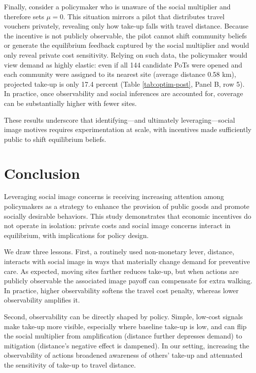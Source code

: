\documentclass[12pt,a4paper]{article}
\begin{document}
Finally, consider a policymaker who is unaware of the social multiplier and therefore sets $\mu=0$. This situation mirrors a pilot that distributes travel vouchers privately, revealing only how take‑up falls with travel distance. Because the incentive is not publicly observable, the pilot cannot shift community beliefs or generate the equilibrium feedback captured by the social multiplier and would only reveal private cost sensitivity. Relying on such data, the policymaker would view demand as highly elastic: even if all 144 candidate PoTs were opened and each community were assigned to its nearest site (average distance 0.58 km), projected take‑up is only 17.4 percent (Table \ref{tab:optim-post}, Panel B, row 5). In practice, once observability and social inferences are accounted for, coverage can be substantially higher with fewer sites.  

These results underscore that identifying—and ultimately leveraging—social image motives requires experimentation at scale, with incentives made sufficiently public to shift equilibrium beliefs.


\FloatBarrier
\section{Conclusion} \label{conclusion}

Leveraging social image concerns is receiving increasing attention among policymakers as a strategy to enhance the provision of public goods and promote socially desirable behaviors. This study demonstrates that economic incentives do not operate in isolation: private costs and social image concerns interact in equilibrium, with implications for policy design.

We draw three lessons. First, a routinely used non-monetary lever, distance, interacts with social image in ways that materially change demand for preventive care. As expected, moving sites farther reduces take-up, but when actions are publicly observable the associated image payoff can compensate for extra walking. In practice, higher observability softens the travel cost penalty, whereas lower observability amplifies it.

Second, observability can be directly shaped by policy. Simple, low-cost signals make take-up more visible, especially where baseline take-up is low, and can flip the social multiplier from amplification (distance further depresses demand) to mitigation (distance’s negative effect is dampened). In our setting, increasing the observability of actions broadened awareness of others’ take-up and attenuated the sensitivity of take-up to travel distance.
\end{document}
